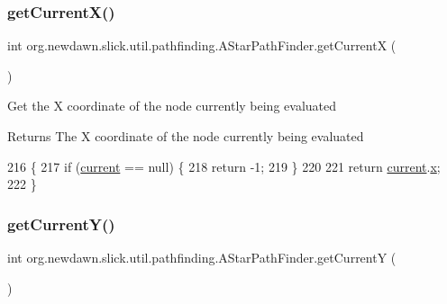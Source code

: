 \subsubsection{\texorpdfstring{get\+Current\+X()}{getCurrentX()}}
{\footnotesize\ttfamily int org.\+newdawn.\+slick.\+util.\+pathfinding.\+A\+Star\+Path\+Finder.\+get\+CurrentX (\begin{DoxyParamCaption}{ }\end{DoxyParamCaption})\hspace{0.3cm}{\ttfamily [inline]}}

Get the X coordinate of the node currently being evaluated

\begin{DoxyReturn}{Returns}
The X coordinate of the node currently being evaluated 
\end{DoxyReturn}

\begin{DoxyCode}
216                              \{
217         \textcolor{keywordflow}{if} (\mbox{\hyperlink{classorg_1_1newdawn_1_1slick_1_1util_1_1pathfinding_1_1_a_star_path_finder_a560430f619222a3148fd1dd01c52b6ad}{current}} == null) \{
218             \textcolor{keywordflow}{return} -1;
219         \}
220         
221         \textcolor{keywordflow}{return} \mbox{\hyperlink{classorg_1_1newdawn_1_1slick_1_1util_1_1pathfinding_1_1_a_star_path_finder_a560430f619222a3148fd1dd01c52b6ad}{current}}.\mbox{\hyperlink{classorg_1_1newdawn_1_1slick_1_1util_1_1pathfinding_1_1_a_star_path_finder_1_1_node_ada4322ce47f95ba2707c0b1a03ea0f87}{x}};
222     \}
\end{DoxyCode}
\mbox{\label{classorg_1_1newdawn_1_1slick_1_1util_1_1pathfinding_1_1_a_star_path_finder_a1e98b93b8c014045a831986f3de390c4}} 
\subsubsection{\texorpdfstring{get\+Current\+Y()}{getCurrentY()}}
{\footnotesize\ttfamily int org.\+newdawn.\+slick.\+util.\+pathfinding.\+A\+Star\+Path\+Finder.\+get\+CurrentY (\begin{DoxyParamCaption}{ }\end{DoxyParamCaption})\hspace{0.3cm}{\ttfamily [inline]}}

